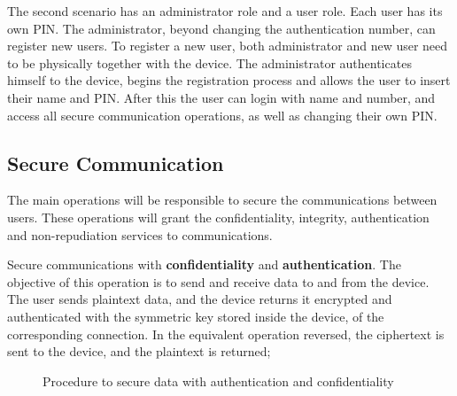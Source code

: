 The second scenario has an administrator role and a user role. Each user has its own \ac{PIN}. The administrator, beyond changing the authentication number, can register new users. To register a new user, both administrator and new user need to be physically together with the device. The administrator authenticates himself to the device, begins the registration process and allows the user to insert their name and \ac{PIN}. After this the user can login with name and number, and access all secure communication operations, as well as changing their own \ac{PIN}.

\subsection{Secure Communication}\label{chap:arch:ops:comms}

The main operations will be responsible to secure the communications between users. These operations will grant the confidentiality, integrity, authentication and non-repudiation services to communications.

Secure communications with \textbf{confidentiality} and \textbf{authentication}. The objective of this operation is to send and receive data to and from the device. The user sends plaintext data, and the device returns it encrypted and authenticated with the symmetric key stored inside the device, of the corresponding connection. In the equivalent operation reversed, the ciphertext is sent to the device, and the plaintext is returned;

\begin{figure}[h]
	\centering     %
	\caption{Procedure to secure data with authentication and confidentiality}
\end{figure}


